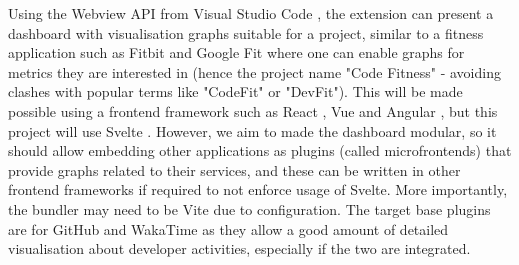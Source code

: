 \documentclass{mprop}
\begin{document}
Using the Webview API from Visual Studio Code \cite{WebviewAPI}, the extension can present a dashboard with visualisation graphs suitable for a project, similar to a fitness application such as Fitbit \cite{FitbitAppDashboarda} and Google Fit \cite{GoogleFita} where one can enable graphs for metrics they are interested in (hence the project name "Code Fitness" \cite{boseCodefitness2022} - avoiding clashes with popular terms like "CodeFit" or "DevFit"). This will be made possible using a frontend framework such as React \cite{ReactJavaScriptLibrary}, Vue \cite{VueJsProgressive} and Angular \cite{Angular}, but this project will use Svelte \cite{SvelteCyberneticallyEnhanced}. However, we aim to made the dashboard modular, so it should allow embedding other applications as plugins (called microfrontends) that provide graphs related to their services, and these can be written in other frontend frameworks if required to not enforce usage of Svelte. More importantly, the bundler may need to be Vite \cite{Vite} due to configuration. The target base plugins are for GitHub and WakaTime \cite{wakatimeWakaTimeDashboardsDevelopers} as they allow a good amount of detailed visualisation about developer activities, especially if the two are integrated.
\end{document}
